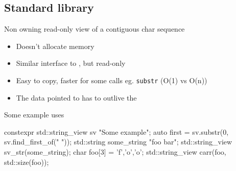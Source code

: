 \subsection[STD]{Standard library}

\begin{frame}[fragile]
  \begin{block}{Non owning read-only view of a contiguous char sequence}
    \begin{itemize}
    \item Doesn't allocate memory
    \item Similar interface to , but read-only
    \item Easy to copy, faster for some calls eg. \texttt{substr} (O(1) vs O(n))
    \item The data pointed to has to outlive the 
    \end{itemize}
  \end{block}
  \begin{exampleblock}{Some example uses}
    \begin{cppcode*}{}
      constexpr std::string_view sv {"Some example"};
      auto first = sv.substr(0, sv.find_first_of(" "));
      std::string some_string {"foo bar"};
      std::string_view sv_str(some_string);
      char foo[3] = {'f','o','o'};
      std::string_view carr(foo, std::size(foo));
    \end{cppcode*}
  \end{exampleblock}
\end{frame}

